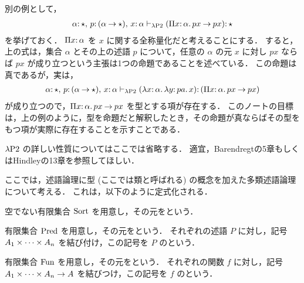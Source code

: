 \documentclass[./main]{subfiles}
\begin{document}
別の例として，
\begin{gather*}
\alpha \mathord{:}\, \mathord{\star},\, p \mathord{:}\, (\alpha \mathbin{\to} \mathord{\star}),\, x \mathord{:}\, \alpha \vdash _{\lambda \mathrm{P2}} (\Pi x \mathord{:}\, \alpha.\, px \mathbin{\to} px) \mathord{:}\, \mathord{\star}
\end{gather*}
を挙げておく．
$ \Pi x \mathord{:}\, \alpha $ を $ x $ に関する全称量化だと考えることにする．
すると，上の式は，集合 $ \alpha $ とその上の述語 $ p $ について，任意の $ \alpha $ の元 $ x $ に対し $ px $ ならば $ px $ が成り立つという主張は1つの命題であることを述べている．
この命題は真であるが，実は，
\begin{gather*}
\alpha \mathord{:}\, \mathord{\star},\, p \mathord{:}\, (\alpha \mathbin{\to} \mathord{\star}),\, x \mathord{:}\, \alpha \vdash _{\lambda \mathrm{P2}} (\lambda x \mathord{:}\, \alpha.\, \lambda y \mathord{:}\, pa.\, x) \mathord{:}\, (\Pi x \mathord{:}\, \alpha.\, px \mathbin{\to} px)
\end{gather*}
が成り立つので，$ \Pi x \mathord{:}\, \alpha.\, px \mathbin{\to} px $ を型とする項が存在する．
このノートの目標は，上の例のように，型を命題だと解釈したとき，その命題が真ならばその型をもつ項が実際に存在することを示すことである．

$ \lambda \mathrm{P2} $ の詳しい性質についてはここでは省略する．
適宜，Barendregt\cite{blct}の5章もしくはHindley\cite{jrh}の13章を参照してほしい．


ここでは，述語論理に型 (ここでは類と呼ばれる) の概念を加えた多類述語論理について考える．
これは，以下のように定式化される．

\begin{ziphildefi}
空でない有限集合 $ \mathop{\mathrm{Sort}}\nolimits $ を用意し，その元をという．
\end{ziphildefi}

\begin{ziphildefi}
有限集合 $ \mathop{\mathrm{Pred}}\nolimits $ を用意し，その元をという．
それぞれの述語 $ P $ に対し，記号 $ A _1 \times \mathord{\cdots} \times A _n $ を結び付け，この記号を $ P $ のという．
\end{ziphildefi}

\begin{ziphildefi}
有限集合 $ \mathop{\mathrm{Fun}}\nolimits $ を用意し，その元をという．
それぞれの関数 $ f $ に対し，記号 $ A _1 \times \mathord{\cdots} \times A _n \to A $ を結びつけ，この記号を $ f $ のという．
\end{ziphildefi}
\end{document}
